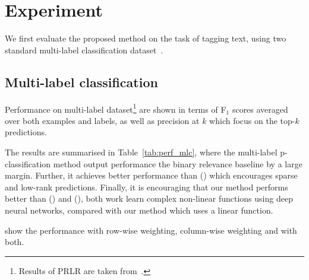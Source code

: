 \section{Experiment}
\label{sec:experiment}

We first evaluate the proposed method on the task of tagging text, 
using two standard multi-label classification dataset~\cite{katakis2008multilabel}.

\subsection{Multi-label classification}

Performance on multi-label dataset\footnote{Results of PRLR are taken from~\citep{lin2014multi}.}
are shown in terms of F$_1$ scores averaged over both examples and labels, 
as well as precision at $k$ which focus on the top-$k$ predictions.

The results are summarised in Table~\ref{tab:perf_mlc},
where the multi-label p-classification method output performance the binary relevance baseline by a large margin.
Further, it achieves better performance than (\citet{lin2014multi}) which encourages sparse and low-rank predictions.
Finally, it is encouraging that our method performs better than (\citet{belanger2016structured}) and (\citet{gygli2017deep}),
both work learn complex non-linear functions using deep neural networks, compared with our method which uses a linear function.

\TODO show the performance with row-wise weighting, column-wise weighting and with both.

\begin{table}[!h]
\centering
\caption{Performance on multi-label dataset}
\label{tab:perf_mlc}
\end{table}


